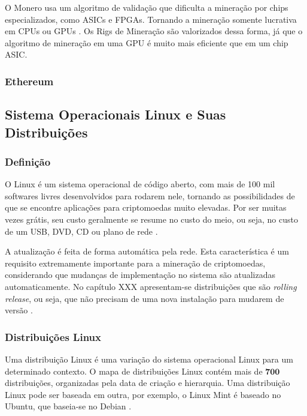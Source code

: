 \documentclass[
article,			%
12pt,				%
openright,			%
oneside,			%
a4paper,			%
chapter=TITLE,		%
section=TITLE,		%
subsection=TITLE,	%
subsubsection=TITLE,%
subsubsubsection=TITLE, %
english,			%
brazil,				%
]{abntex2}
\begin{document}
O Monero usa um algoritmo de validação que dificulta a mineração por
chips especializados, como ASICs e FPGAs.  Tornando a mineração
somente lucrativa em CPUs ou GPUs \cite{Weber2012}. Os Rigs de
Mineração são valorizados dessa forma, já que o algoritmo de mineração
em uma GPU é muito mais eficiente que em um chip ASIC\@.

\subsubsection{Ethereum}

\subsection{Sistema Operacionais Linux e Suas
Distribuições}\label{cap:sistemas-linux}

\subsubsection{Definição}

O Linux é um sistema operacional de código aberto, com mais de 100 mil
softwares livres desenvolvidos para rodarem nele, tornando as
possibilidades de que se encontre aplicações para criptomoedas muito
elevadas. Por ser muitas vezes grátis, seu custo geralmente se resume
no custo do meio, ou seja, no custo de um USB, DVD, CD ou plano de
rede \cite{Nunes2009}.

A atualização é feita de forma automática pela rede. Esta
característica é um requisito extremamente importante para a mineração
de criptomoedas, considerando que mudanças de implementação no sistema
são atualizadas automaticamente. No capítulo XXX apresentam-se
distribuições que são \emph{rolling release}, ou seja, que não
precisam de uma nova instalação para mudarem de versão
\cite{Nunes2009, ArchWiki2018a}.

\subsubsection{Distribuições Linux}\label{sec:distribuicoes-linux}

Uma distribuição Linux é uma variação do sistema operacional Linux
para um determinado contexto. O mapa de distribuições Linux contém
mais de $\mathbf{700}$ distribuições, organizadas pela data de criação
e hierarquia. Uma distribuição Linux pode ser baseada em outra, por
exemplo, o Linux Mint é baseado no Ubuntu, que baseia-se no Debian
\cite{Loli2017}.
\end{document}
